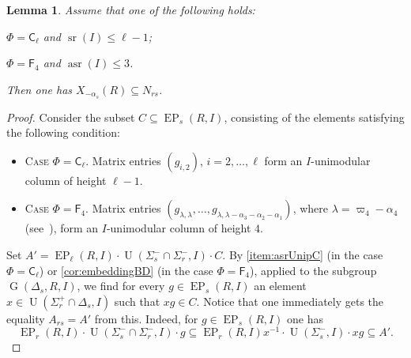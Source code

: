 \documentclass[11pt]{amsart}
\theoremstyle{plain}
\numberwithin{equation}{section}
\newtheorem{lemma}{Lemma}
\numberwithin{lemma}{section}
\theoremstyle{definition}
\theoremstyle{remark}
\DeclareMathOperator{\G}{G}
\DeclareMathOperator{\EP}{EP}
\DeclareMathOperator{\U}{U}
\DeclareMathOperator{\sr}{sr}
\DeclareMathOperator{\asr}{asr}
\newcommand{\rC}{\mathsf{C}}
\newcommand{\rF}{\mathsf{F}}
\begin{document}
\begin{lemma}\label{lemma:DVST}
Assume that one of the following holds:
\begin{lemlist}
 \item \label{lemma:DVcaseCl} $\Phi=\rC_\ell$ and $\sr(I) \leq \ell-1$;
 \item \label{lemma:DVcaseF4} $\Phi=\rF_4$ and $\asr(I) \leq 3$.
\end{lemlist}
Then one has $X_{-\alpha_s}(R) \subseteq N_{rs}$.
\end{lemma}
\begin{proof}
Consider the subset $C \subseteq \EP_s(R, I)$, consisting of the elements satisfying the following condition:
\begin{itemize}
 \item \textsc{Case $\Phi=\rC_\ell$.} Matrix entries $(g_{i, 2})$, $i=2, \ldots, \ell$ form an $I$-unimodular column of height $\ell-1$.
 \item \textsc{Case $\Phi=\rF_4$.} Matrix entries $(g_{\lambda, \lambda}, \ldots, g_{\lambda, \lambda - \alpha_3 - \alpha_2 - \alpha_1})$, where $\lambda = \varpi_4 - \alpha_4$ (see~\cite[Fig.~26]{PSV98}), 
                                     form an $I$-unimodular column of height $4$. \end{itemize}

Set $A' = \EP_\ell(R, I) \cdot \U(\Sigma_s^- \cap \Sigma_r^-, I) \cdot C$.
By \cref{item:asrUnipC} (in the case $\Phi=\rC_\ell$) or \cref{cor:embeddingBD} (in the case $\Phi=\rF_4$), applied to the subgroup $\G(\Delta_s, R, I)$,
we find for every $g \in \EP_s(R, I)$ an element $x \in \U(\Sigma_r^+ \cap \Delta_s, I)$ such that $xg \in C$.  
Notice that one immediately gets the equality $A_{rs} = A'$ from this.
Indeed, for $g\in \EP_s(R, I)$ one has
\begin{equation*} \EP_r(R, I) \cdot \U(\Sigma_s^- \cap \Sigma_r^-, I) \cdot g \subseteq 
 \EP_r(R, I)x^{-1}  \cdot \U(\Sigma_s^-, I) \cdot xg \subseteq A'. \end{equation*}


\end{proof}
\end{document}

